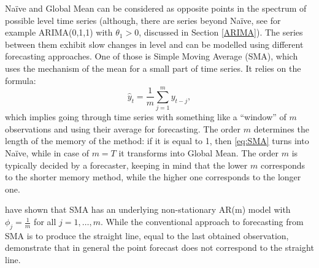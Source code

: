 \documentclass[
]{book}
\theoremstyle{definition}
\theoremstyle{definition}
\theoremstyle{definition}
\theoremstyle{definition}
\theoremstyle{remark}
\begin{document}
Naïve and Global Mean can be considered as opposite points in the spectrum of possible level time series (although, there are series beyond Naïve, see for example ARIMA(0,1,1) with \(\theta_1>0\), discussed in Section \ref{ARIMA}). The series between them exhibit slow changes in level and can be modelled using different forecasting approaches. One of those is Simple Moving Average (SMA), which uses the mechanism of the mean for a small part of time series. It relies on the formula:
\begin{equation}
    \hat{y}_t = \frac{1}{m}\sum_{j=1}^{m} y_{t-j},
    \label{eq:SMA}
\end{equation}
which implies going through time series with something like a ``window'' of \(m\) observations and using their average for forecasting. The order \(m\) determines the length of the memory of the method: if it is equal to 1, then \eqref{eq:SMA} turns into Naïve, while in case of \(m=T\) it transforms into Global Mean. The order \(m\) is typically decided by a forecaster, keeping in mind that the lower \(m\) corresponds to the shorter memory method, while the higher one corresponds to the longer one.

\citet{Svetunkov2017} have shown that SMA has an underlying non-stationary AR(m) model with \(\phi_j=\frac{1}{m}\) for all \(j=1, \dots, m\). While the conventional approach to forecasting from SMA is to produce the straight line, equal to the last obtained observation, \citet{Svetunkov2017} demonstrate that in general the point forecast does not correspond to the straight line.
\end{document}
